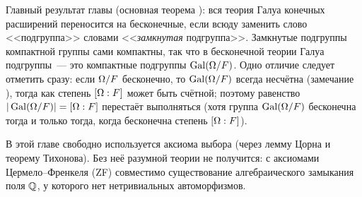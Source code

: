 \begin{center}
\end{center}

Главный результат главы (основная теорема ): вся теория Галуа конечных расширений переносится на бесконечные, если
всюду заменить слово <<подгруппа>> словами <<\emph{замкнутая} подгруппа>>. Замкнутые подгруппы компактной группы сами компактны, так что
в бесконечной теории Галуа подгруппы~--- это компактные подгруппы $\operatorname{Gal}(\Omega/F)$. Одно отличие следует отметить сразу: если
$\Omega/F$ бесконечно, то $\operatorname{Gal}(\Omega/F)$ всегда несчётна (замечание ), тогда как степень $[\Omega:F]$ может быть счётной;
поэтому равенство $|\operatorname{Gal}(\Omega/F)|=[\Omega:F]$ перестаёт выполняться (хотя группа $\operatorname{Gal}(\Omega/F)$
бесконечна тогда и только тогда, когда бесконечна степень $[\Omega:F]$).

\begin{remark}
В этой главе свободно используется аксиома выбора (через лемму Цорна и теорему Тихонова). Без неё разумной теории не
получится: с аксиомами Цермело--Френкеля (ZF) совместимо существование алгебраического замыкания поля $\mathbb Q$, у
которого нет нетривиальных автоморфизмов.
\end{remark}
